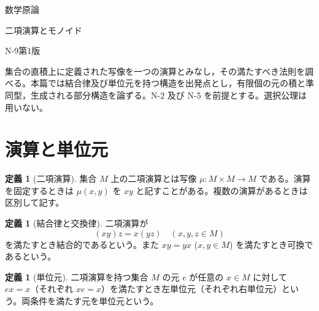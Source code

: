\documentclass[a5paper,10pt,dvipdfmx]{jsarticle}
\theoremstyle{definition}
\newtheorem{defn}[ruledef]{定義}
\theoremstyle{plain}
\begin{document}
\begin{center}
{\small 数学原論}\par\vspace{4mm}
{\LARGE 二項演算とモノイド}\par\vspace{2mm}
{\small N-9\quad 第1版}
\end{center}
集合の直積上に定義された写像を一つの演算とみなし，その満たすべき法則を調べる。本篇では結合律及び単位元を持つ構造を出発点とし，有限個の元の積と準同型，生成される部分構造を論ずる。N-2 及び N-5 を前提とする。選択公理は用いない。
\section{演算と単位元}
\begin{defn}[二項演算]\label{k159}
集合 $M$ 上の二項演算とは写像 $\mu\colon M\times M\to M$ である。演算を固定するときは $\mu(x,y)$ を $xy$ と記すことがある。複数の演算があるときは区別して記す。
\end{defn}
\begin{defn}[結合律と交換律]\label{k160}
二項演算が
\[ (xy)z=x(yz)\quad(x,y,z\in M) \]
を満たすとき結合的であるという。また $xy=yx$ ($x,y\in M$) を満たすとき可換であるという。
\end{defn}
\begin{defn}[単位元]\label{k161}
二項演算を持つ集合 $M$ の元 $e$ が任意の $x\in M$ に対して $ex=x$（それぞれ $xe=x$）を満たすとき左単位元（それぞれ右単位元）という。両条件を満たす元を単位元という。
\end{defn}
\end{document}

